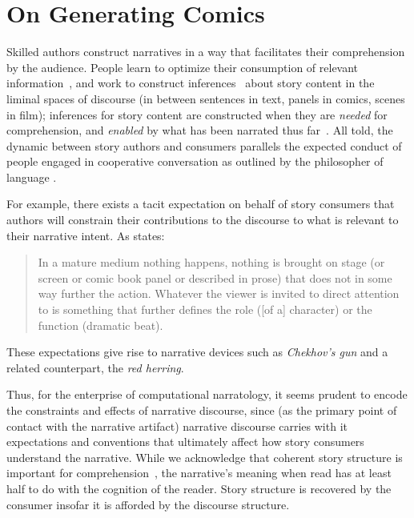 \section{On Generating Comics}

Skilled authors construct narratives in a way that facilitates their
comprehension by the audience. People learn to optimize their consumption of
relevant information~\cite{pirolli2007information}, and work to construct
inferences~\cite{magliano2016filling} about story content in the liminal spaces
of discourse (in between sentences in text, panels in comics, scenes in film);
inferences for story content are constructed when they are \emph{needed} for
comprehension, and \emph{enabled} by what has been narrated thus
far~\cite{myers1987degree}. All told, the dynamic between story authors and
consumers parallels the expected conduct of people engaged in cooperative
conversation as outlined by the philosopher of language .

For example, there 
exists a tacit expectation on behalf of story consumers that authors
will constrain their contributions to the discourse to what is relevant to
their narrative intent. As  states:
%
\begin{quote} 
	In a mature medium nothing happens, nothing is brought on stage (or screen 
	or comic book panel or described in prose) that does not in some way further 
	the action. Whatever the viewer is invited to direct attention to is
	something that further defines the role ([of a] character) or the function 
	(dramatic beat). 
	\end{quote}
%
These expectations give rise to narrative devices such as \emph{Chekhov's
gun}
and a related counterpart, the \emph{red herring}.

Thus, for the enterprise of computational narratology, it seems prudent to
encode the constraints and effects of narrative
discourse, since (as the primary point of contact with the narrative artifact)
narrative discourse carries with it expectations and conventions that
ultimately affect how story consumers understand the narrative. While we
acknowledge that coherent story structure is important for
comprehension~\cite{graesser2002how}, the narrative's meaning when read has
at least half to do with the cognition of the reader.
Story structure is recovered by the consumer insofar it is afforded by the
discourse structure. 

